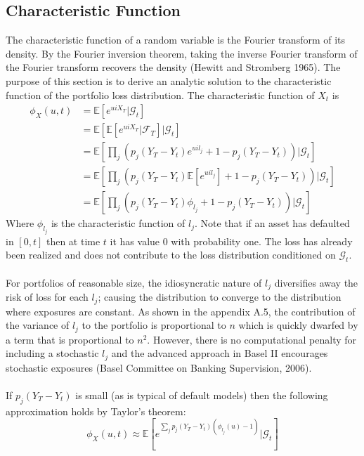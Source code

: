 \documentclass[12pt]{article}
\theoremstyle{definition}
\begin{document}
\subsection{Characteristic Function}
The characteristic function of a random variable is the Fourier transform of its density.  By the Fourier inversion theorem, taking the inverse Fourier transform of the Fourier transform recovers the density (Hewitt and Stromberg 1965).  The purpose of this section is to derive an analytic solution to the characteristic function of the portfolio loss distribution.  The characteristic function of \(X_t\) is
\begin{align}\phi_X (u, t) &=\mathbb{E}\left[e^{uiX_T}|\mathcal{G}_t\right]\\
&=\mathbb{E}\left[\mathbb{E} \left[ e^{uiX_{T}}|\mathcal{F}_T\right]|\mathcal{G}_t \right]\\
&=\mathbb{E}\left[  \prod_j \left(p_j (Y_T-Y_t) e^{ui l_j}+1-p_j(Y_T-Y_t)\right) |\mathcal{G}_t \right]\\
&=\mathbb{E}\left[  \prod_j \left(p_j (Y_T-Y_t) \mathbb{E}\left[e^{ui l_j}\right]+1-p_j(Y_T-Y_t)\right) |\mathcal{G}_t \right]\\
&=\mathbb{E}\left[  \prod_j \left(p_j (Y_T-Y_t) \phi_{l_j}+1-p_j(Y_T-Y_t)\right) |\mathcal{G}_t \right] \end{align}
Where \(\phi_{l_j}\) is the characteristic function of \(l_j\).  Note that if an asset has defaulted in \([0, t]\) then at time \(t\) it has value \(0\) with probability one.  The loss has already been realized and does not contribute to the loss distribution conditioned on \(\mathcal{G}_t\). 
\\
\\
For portfolios of reasonable size, the idiosyncratic nature of \(l_j\) diversifies away the risk of loss for each \(l_j\); causing the distribution to converge to the distribution where exposures are constant.  As shown in the appendix A.5, the contribution of the variance of \(l_j\) to the portfolio is proportional to \(n\) which is quickly dwarfed by a term that is proportional to \(n^2\).  However, there is no computational penalty for including a stochastic \(l_j\) and the advanced approach in Basel II encourages stochastic exposures (Basel Committee on Banking Supervision, 2006).  
\\
\\
If \(p_j (Y_T - Y_t)\) is small (as is typical of default models) then the following approximation holds by Taylor's theorem:
\begin{equation}\phi_X (u, t) \approx \mathbb{E}\left[ e^{\sum_j p_j(Y_T-Y_t) \left(\phi_{l_j}(u)-1\right)} | \mathcal{G}_t \right]\end{equation}
\end{document}
